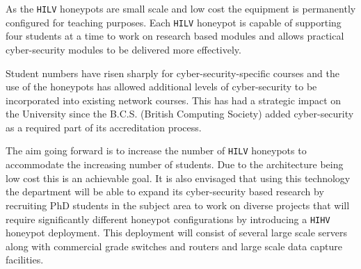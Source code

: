 As the \texttt{HILV} honeypots are small scale and low cost the equipment is
permanently configured for teaching purposes. Each \texttt{HILV} honeypot is
capable of supporting four students at a time to work on research based modules
and allows practical cyber-security modules to be delivered more effectively.

Student numbers have risen sharply for cyber-security-specific courses and the
use of the honeypots has allowed additional levels of cyber-security to be
incorporated into existing network courses. This has had a strategic impact on
the University since the B.C.S. (British Computing Society) added
cyber-security as a required part of its accreditation process.

The aim going forward is to increase the number of \texttt{HILV} honeypots to
accommodate the increasing number of students. Due to the architecture being
low cost this is an achievable goal. It is also envisaged that using this
technology the department will be able to expand its cyber-security based
research by recruiting PhD students in the subject area to work on diverse
projects that will require significantly different honeypot configurations by
introducing a \texttt{HIHV} honeypot deployment. This deployment will consist
of several large scale servers along with commercial grade switches and routers
and large scale data capture facilities.


